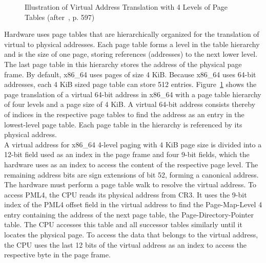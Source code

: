 \begin{figure}
  \begin{center}
    
    \caption{Illustration of Virtual Address Translation with 4 Levels of Page Tables (after~\cite{amd_manual}, p. 597)}
    \label{fig:state:technical:paging}
  \end{center}
\end{figure}

Hardware uses page tables that are hierarchically organized for the translation
of virtual to physical addresses. Each page table forms a level in the table
hierarchy and is the size of one page, storing references (addresses) to the
next lower level. The last page table in this hierarchy stores the address of
the physical page frame. By default, x86\_64 uses pages of size 4 KiB. Because
x86\_64 uses 64-bit addresses, each 4 KiB sized page table can store 512
entries. Figure~\ref{fig:state:technical:paging} shows the page translation of a
virtual 64-bit address in x86\_64 with a page table hierarchy of four levels and
a page size of 4 KiB. A virtual 64-bit address consists thereby of indices in
the respective page tables to find the address as an entry in the lowest-level
page table. Each page table in the hierarchy is referenced by its physical
address.\\

A virtual address for x86\_64 4-level paging with 4 KiB page size is divided
into a 12-bit field used as an index in the page frame and four 9-bit fields,
which the hardware uses as an index to access the content of the respective page
level. The remaining address bits are sign extensions of bit 52, forming a
canonical address. The hardware must perform a page table walk to resolve the
virtual address.
To access PML4, the CPU reads its physical address from CR3. It
uses the 9-bit index of the PML4 offset field in the virtual address to find the
Page-Map-Level 4 entry containing the address of the next page table, the
Page-Directory-Pointer table. The CPU accesses this table and all successor
tables similarly until it locates the physical page. To access the data that
belongs to the virtual address, the CPU uses the last 12 bits of the virtual
address as an index to access the respective byte in the page frame. \\

